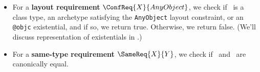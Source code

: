 \documentclass[../generics]{subfiles}
\begin{document}
\begin{algorithm}
\begin{itemize}
\begin{enumerate}
\end{enumerate}
\item For a \textbf{layout requirement} $\ConfReq{X}{AnyObject}$, we check if \tX\ is a class type, an archetype satisfying the \texttt{AnyObject} layout constraint, or an \texttt{@objc} existential, and if so, we return true. Otherwise, we return false. (We'll discuss representation of existentials in .)
\item For a \textbf{same-type requirement} $\SameReq{X}{Y}$, we check if \tX\ and \tY\ are canonically equal.
\end{itemize}
\end{algorithm}
\end{document}
